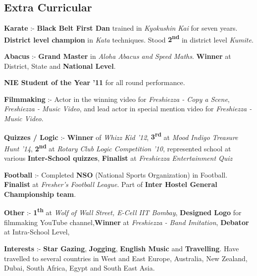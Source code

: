 \documentclass[11pt]{resume}
\begin{document}
\begin{resume}
\section{\mysidestyle Extra Curricular}
\begin{list2}
\item \textbf {Karate} :- \textbf{Black Belt First Dan} trained in \textsl{Kyokushin Kai} for seven years. \textbf{District level champion} in \textsl{Kata} techniques. Stood \textbf {2\textsuperscript{nd}} in district level \textsl{Kumite}.
\item \textbf {Abacus} :- \textbf{Grand Master} in \textsl{Aloha Abacus and Speed Maths}. \textbf{Winner} at District, State and \textbf{National Level}.
\item \textbf {NIE Student of the Year '11} for all round performance. 
\item \textbf {Filmmaking} :- Actor in the winning video for \textsl{Freshiezza - Copy a Scene}, \textsl{Freshiezza - Music Video}, and lead actor in special mention video for \textsl{Freshiezza - Music Video}.
\item \textbf {Quizzes / Logic} :- \textbf{Winner} of \textsl{Whizz Kid '12}, \textbf{3\textsuperscript{rd}} at \textsl{Mood Indigo Treasure Hunt '14}, \textbf{2\textsuperscript{nd}} at \textsl{Rotary Club Logic Competition '10}, represented school at various \textbf{Inter-School quizzes}, \textbf{Finalist} at \textsl{Freshiezza Entertainment Quiz}
\pagebreak
\item \textbf {Football} :- Completed \textbf{NSO} (National Sports Organization) in Football. \textbf{Finalist} at \textsl{Fresher's Football League}. Part of \textbf{Inter Hostel General Championship team}.
\item \textbf {Other} :- \textbf{1\textsuperscript{th}} at \textsl {Wolf of Wall Street, E-Cell IIT Bombay}, \textbf{Designed Logo} for filmmaking YouTube channel,\textbf{Winner} at \textsl{Freshiezza - Band Imitation},  \textbf{Debator} at Intra-School Level, 

\item \textbf {Interests} :- \textbf{Star Gazing}, \textbf{Jogging}, \textbf{English Music} and \textbf{Travelling}. Have travelled to several countries in West and East Europe, Australia, New Zealand, Dubai, South Africa, Egypt and South East Asia.
\end{list2}



    

\end{resume}
\end{document}
